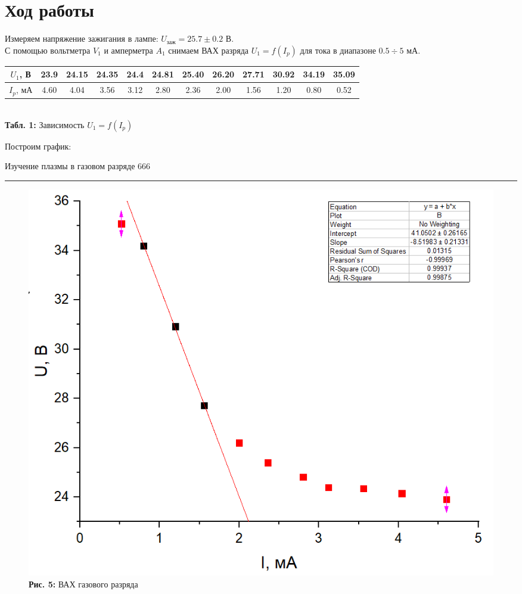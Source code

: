 \documentclass[12pt,a4paper]{scrartcl}
\begin{document}
	
\section{Ход работы}
Измеряем напряжение зажигания в лампе: $U_{\text{заж}} = 25.7\pm 0.2$ В.\\
С помощью вольтметра $V_1$ и амперметра $A_1$ снимаем ВАХ разряда $U_1=f(I_p)$ для тока в диапазоне $0.5 \div 5$ мА.

\begin{table}[h]
\centering
\begin{tabular}{|c|c|c|c|c|c|c|c|c|c|c|c|}
\hline
$U_1$, В & 23.9 & 24.15 & 24.35 & 24.4 & 24.81 & 25.40 & 26.20 & 27.71 & 30.92 & 34.19 & 35.09 \\ \hline
$I_p$, мА & 4.60 & 4.04  & 3.56  & 3.12 & 2.80  & 2.36  & 2.00  & 1.56  & 1.20  & 0.80  & 0.52  \\ \hline
\end{tabular}
\\\textbf{Табл. 1:} Зависимость $U_1 = f(I_p)$
\end{table}

Построим график:


\newpage


	\begin{flushleft}
		\footnotesize{Изучение плазмы в газовом разряде} \hspace{\fill} \footnotesize{666}
		\\[-0.3cm]\noindent\rule{\textwidth}{0.3pt}
	\end{flushleft}	

\begin{figure}[h]
\centering
\includegraphics[scale=0.6]{PIC_6.png}
\\\textbf{Рис. 5:} ВАХ газового разряда
\end{figure}
\end{document}
